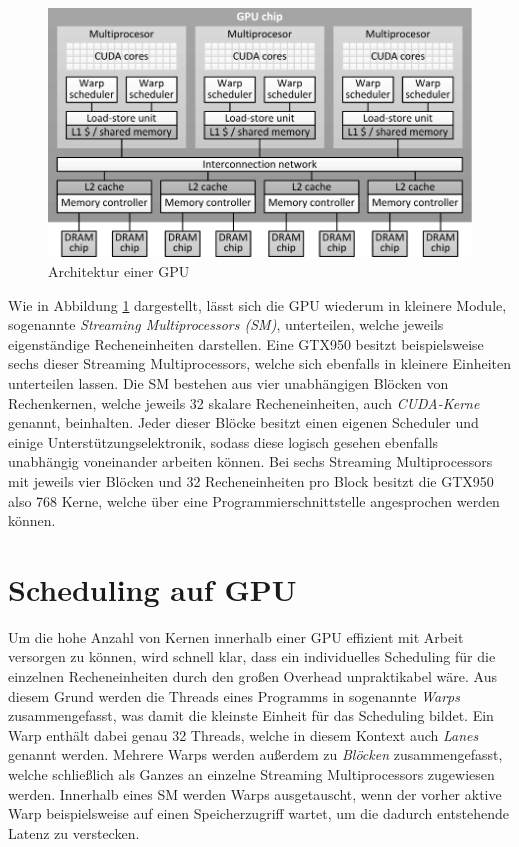 \begin{figure}[ht]
	\includegraphics[]{bilder/gpu_architecture.pdf}
	\caption{Architektur einer GPU \cite{Volkov2016}}
	\label{gpu_architecture}
\end{figure}

Wie in Abbildung \ref{gpu_architecture} dargestellt, lässt sich die GPU wiederum in kleinere Module, sogenannte \emph{Streaming Multiprocessors (SM)}, unterteilen, welche jeweils eigenständige Recheneinheiten darstellen.
Eine GTX950 besitzt beispielsweise sechs dieser Streaming Multiprocessors, welche sich ebenfalls in kleinere Einheiten unterteilen lassen.
Die SM bestehen aus vier unabhängigen Blöcken von Rechenkernen, welche jeweils 32 skalare Recheneinheiten, auch \emph{CUDA-Kerne} genannt, beinhalten.
Jeder dieser Blöcke besitzt einen eigenen Scheduler und einige Unterstützungselektronik, sodass diese logisch gesehen ebenfalls unabhängig voneinander arbeiten können. \cite{Nvidia2014}
Bei sechs Streaming Multiprocessors mit jeweils vier Blöcken und 32 Recheneinheiten pro Block besitzt die GTX950 also 768 Kerne, welche über eine Programmierschnittstelle angesprochen werden können.

\section{Scheduling auf GPU}

Um die hohe Anzahl von Kernen innerhalb einer GPU effizient mit Arbeit versorgen zu können, wird schnell klar, dass ein individuelles Scheduling für die einzelnen Recheneinheiten durch den großen Overhead unpraktikabel wäre.
Aus diesem Grund werden die Threads eines Programms in sogenannte \emph{Warps} zusammengefasst, was damit die kleinste Einheit für das Scheduling bildet.
Ein Warp enthält dabei genau 32 Threads, welche in diesem Kontext auch \emph{Lanes} genannt werden.
Mehrere Warps werden außerdem zu \emph{Blöcken} zusammengefasst, welche schließlich als Ganzes an einzelne Streaming Multiprocessors zugewiesen werden.
Innerhalb eines SM werden Warps ausgetauscht, wenn der vorher aktive Warp beispielsweise auf einen Speicherzugriff wartet, um die dadurch entstehende Latenz zu verstecken.

